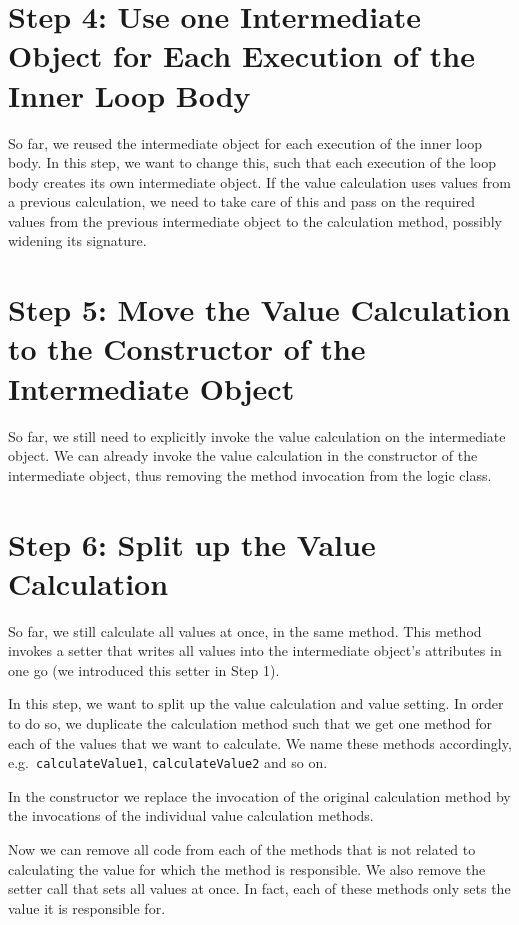\documentclass[a4paper,fleqn,titlepage,11pt]{article}
\begin{document}
\section{Step 4: Use one Intermediate Object for Each Execution of the Inner Loop Body}

So far, we reused the intermediate object for each execution of the inner loop body. In this step, we want to change this, such that each execution of the loop body creates its own intermediate object. If the value calculation uses values from a previous calculation, we need to take care of this and pass on the required values from the previous intermediate object to the calculation method, possibly widening its signature.

\section{Step 5: Move the Value Calculation to the Constructor of the Intermediate Object}

So far, we still need to explicitly invoke the value calculation on the intermediate object. We can already invoke the value calculation in the constructor of the intermediate object, thus removing the method invocation from the logic class.

\section{Step 6: Split up the Value Calculation}

So far, we still calculate all values at once, in the same method. This method invokes a setter that writes all values into the intermediate object's attributes in one go (we introduced this setter in Step 1).

In this step, we want to split up the value calculation and value setting. In order to do so, we duplicate the calculation method such that we get one method for each of the values that we want to calculate. We name these methods accordingly, e.g.~\texttt{calculateValue1}, \texttt{calculateValue2} and so on.

In the constructor we replace the invocation of the original calculation method by the invocations of the individual value calculation methods.

Now we can remove all code from each of the methods that is not related to calculating the value for which the method is responsible. We also remove the setter call that sets all values at once. In fact, each of these methods only sets the value it is responsible for.
\end{document}
